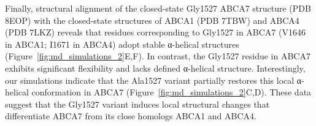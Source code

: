 \quoteO

Finally, structural alignment of the closed-state Gly1527 ABCA7 structure (PDB 8EOP) with the closed-state structures of ABCA1 (PDB 7TBW) and ABCA4 (PDB 7LKZ) reveals that residues corresponding to Gly1527 in ABCA7 (V1646 in ABCA1; I1671 in ABCA4) adopt stable α-helical structures (Figure~\ref{fig:md_simulations_2}E,F). In contrast, the Gly1527 residue in ABCA7 exhibits significant flexibility and lacks defined α-helical structure. Interestingly, our simulations indicate that the Ala1527 variant partially restores this local α-helical conformation in ABCA7 (Figure~\ref{fig:md_simulations_2}C,D). These data suggest that the Gly1527 variant induces local structural changes that differentiate ABCA7 from its close homologs ABCA1 and ABCA4.
